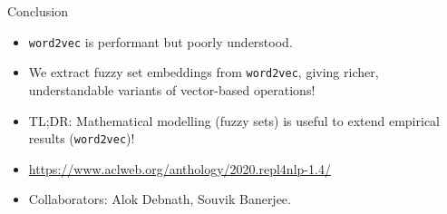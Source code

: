 \documentclass[8pt]{beamer}
\begin{document}
\begin{frame}{Conclusion}
  \begin{itemize}
    \item \texttt{word2vec} is performant but poorly understood.
    \item We extract fuzzy set embeddings from \texttt{word2vec}, giving richer, understandable variants of vector-based operations!
    \item TL;DR: Mathematical modelling (fuzzy sets) is useful to extend empirical results (\texttt{word2vec})!
    \item \url{https://www.aclweb.org/anthology/2020.repl4nlp-1.4/}
    \item Collaborators: Alok Debnath, Souvik Banerjee.
  \end{itemize}
\end{frame}
\end{document}
